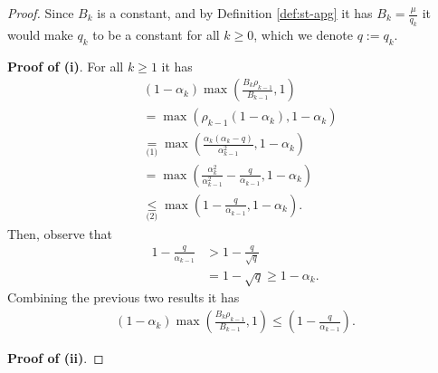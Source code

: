 \documentclass[12pt]{article}
\begin{document}
        \begin{proof}
            Since $B_k$ is a constant, and by Definition \ref{def:st-apg} it has $B_k = \frac{\mu}{q_k}$ it would make $q_k$ to be a constant for all $k \ge 0$, which we denote $q := q_k$. 
            \par
            \textbf{Proof of (i)}. 
            For all $k \ge 1$ it has 
            \begin{align*}
                & (1 - \alpha_k)\max\left(
                    \frac{B_k\rho_{k - 1}}{B_{k - 1}}, 1
                \right)
                \\
                &= \max(\rho_{k - 1}(1 - \alpha_k), 1 - \alpha_k) 
                \\
                &\underset{\text{(1)}}{=} \max\left(
                    \frac{\alpha_k(\alpha_k - q)}{\alpha_{k - 1}^2}, 1 - \alpha_k
                \right)
                \\
                &= \max\left(
                    \frac{\alpha_k^2}{\alpha_{k - 1}^2} - \frac{q}{\alpha_{k - 1}}, 1 - \alpha_k
                \right)
                \\
                &\underset{\text{(2)}}{\le} 
                \max\left(
                    1 - \frac{q}{\alpha_{k - 1}}, 1 - \alpha_k
                \right). 
            \end{align*}
            Then, observe that
            \begin{align*}
                1 - \frac{q}{\alpha_{k - 1}} &> 1 - \frac{q}{\sqrt{q}}
                \\
                &= 1 - \sqrt{q} \ge 1 - \alpha_k. 
            \end{align*}
            Combining the previous two results it has 
            \begin{align*}
                (1 - \alpha_k)\max\left(
                    \frac{B_k\rho_{k - 1}}{B_{k - 1}}, 1
                \right) \le 
                \left(1 - \frac{q}{\alpha_{k - 1}}\right).
            \end{align*}
            \par 
            \textbf{Proof of (ii)}. 
            
        \end{proof}
\end{document}
